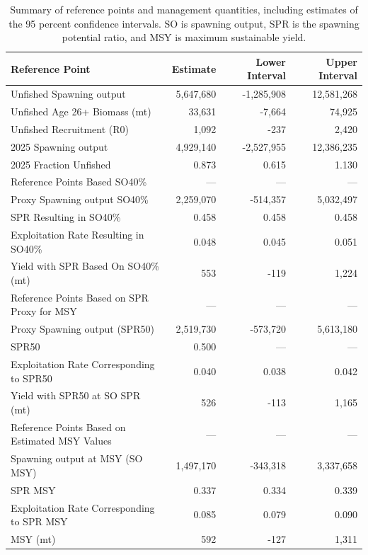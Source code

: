 \documentclass[
]{scrartcl}
\begin{document}
\begin{longtable}{lrrr}

\caption{\label{tbl-ref-points}Summary of reference points and
management quantities, including estimates of the 95 percent confidence
intervals. SO is spawning output, SPR is the spawning potential ratio,
and MSY is maximum sustainable yield.}

\tabularnewline

\toprule
Reference Point & Estimate & Lower Interval & Upper Interval \\ 
\midrule\addlinespace[2.5pt]
Unfished Spawning output & 5,647,680 & -1,285,908 & 12,581,268 \\ 
Unfished Age 26+ Biomass (mt) & 33,631 & -7,664 & 74,925 \\ 
Unfished Recruitment (R0) & 1,092 & -237 & 2,420 \\ 
2025 Spawning output & 4,929,140 & -2,527,955 & 12,386,235 \\ 
2025 Fraction Unfished & 0.873 & 0.615 & 1.130 \\ 
Reference Points Based SO40\% & — & — & — \\ 
Proxy Spawning output SO40\% & 2,259,070 & -514,357 & 5,032,497 \\ 
SPR Resulting in SO40\% & 0.458 & 0.458 & 0.458 \\ 
Exploitation Rate Resulting in SO40\% & 0.048 & 0.045 & 0.051 \\ 
Yield with SPR Based On SO40\% (mt) & 553 & -119 & 1,224 \\ 
Reference Points Based on SPR Proxy for MSY & — & — & — \\ 
Proxy Spawning output (SPR50) & 2,519,730 & -573,720 & 5,613,180 \\ 
SPR50 & 0.500 & — & — \\ 
Exploitation Rate Corresponding to SPR50 & 0.040 & 0.038 & 0.042 \\ 
Yield with SPR50 at SO SPR (mt) & 526 & -113 & 1,165 \\ 
Reference Points Based on Estimated MSY Values & — & — & — \\ 
Spawning output at MSY (SO MSY) & 1,497,170 & -343,318 & 3,337,658 \\ 
SPR MSY & 0.337 & 0.334 & 0.339 \\ 
Exploitation Rate Corresponding to SPR MSY & 0.085 & 0.079 & 0.090 \\ 
MSY (mt) & 592 & -127 & 1,311 \\ 
\bottomrule

\end{longtable}
\end{document}
